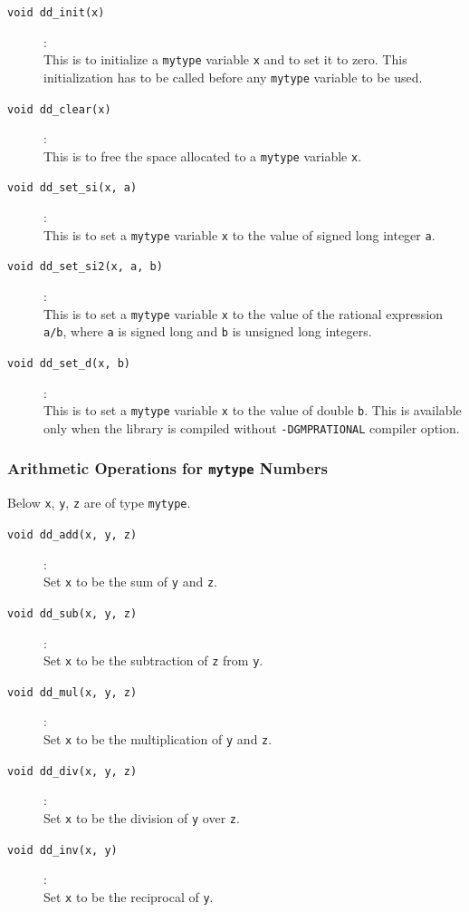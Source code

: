\documentclass[11pt]{article}
\newcommand {\0} {{\bf 0}}
\begin{document}
\begin{description}


\item[{\tt void dd\_init(x)}]:\\
This is to initialize a {\tt mytype} variable {\tt x} and to set it
to zero.    This initialization has to be called before
any {\tt mytype} variable to be used.

\item[{\tt void dd\_clear(x)}]:\\
This is to free the space allocated to a {\tt mytype} variable {\tt x}.

\item[{\tt void dd\_set\_si(x, a)}]:\\
This is to set a {\tt mytype} variable {\tt x} to the
value of signed long integer {\tt a}.

\item[{\tt void dd\_set\_si2(x, a, b)}]:\\
This is to set a {\tt mytype} variable {\tt x} to the
value of  the rational expression {\tt a/b}, where
{\tt a} is signed long and  {\tt b} is unsigned long
integers.

\item[{\tt void dd\_set\_d(x, b)}]:\\
This is to set a {\tt mytype} variable {\tt x} to the
value of double {\tt b}.  This is available only
when the library is compiled without {\tt -DGMPRATIONAL}
compiler option.

\end{description}


\subsubsection{Arithmetic Operations for {\tt mytype} Numbers}

Below  {\tt x}, {\tt y}, {\tt z}  are of type {\tt mytype}.

\begin{description}

\item[{\tt void dd\_add(x, y, z)}]:\\
Set {\tt x} to be the sum of  {\tt y} and  {\tt z}.

\item[{\tt void dd\_sub(x, y, z)}]:\\
Set {\tt x} to be the subtraction of  {\tt z}  from  {\tt y}.

\item[{\tt void dd\_mul(x, y, z)}]:\\
Set {\tt x} to be the multiplication of  {\tt y}  and  {\tt z}.

\item[{\tt void dd\_div(x, y, z)}]:\\
Set {\tt x} to be the division of  {\tt y}  over  {\tt z}.

\item[{\tt void dd\_inv(x, y)}]:\\
Set {\tt x} to be the reciprocal of  {\tt y}.

\end{description}
\end{document}
